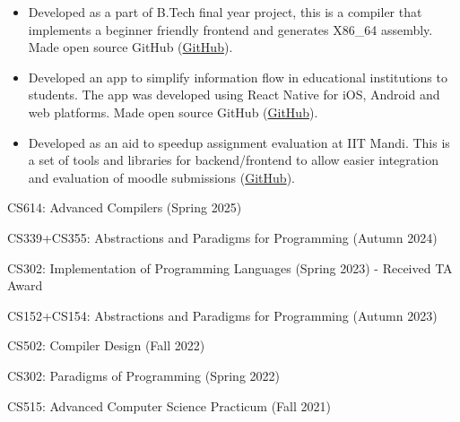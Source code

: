 \documentclass[10pt,a4paper,ragged2e]{altacv}
\begin{document}
\begin{itemize}
\item Developed as a part of B.Tech final year project, this is a compiler that implements a beginner friendly frontend and generates X86\_64 assembly. Made open source GitHub (\href{https://github.com/meetesh06/xope_4.2}{GitHub}).
\end{itemize}
\smallskip
{}
\begin{itemize}
\item Developed an app to simplify information flow in educational institutions to students. The app was developed using React Native for iOS, Android and web platforms. Made open source GitHub (\href{https://github.com/meetesh06/CampusStory}{GitHub}).
\end{itemize}
\smallskip
{}
\begin{itemize}
\item Developed as an aid to speedup assignment evaluation at IIT Mandi. This is a set of tools and libraries for backend/frontend to allow easier integration and evaluation of moodle submissions (\href{https://github.com/CompL-Research/CompL-Evaluator-Backend}{GitHub}).
\end{itemize}
\smallskip




CS614: Advanced Compilers (Spring 2025)
\smallskip

CS339+CS355: Abstractions and Paradigms for Programming (Autumn 2024)
\smallskip

CS302: Implementation of Programming Languages (Spring 2023) - Received TA Award
\smallskip

CS152+CS154: Abstractions and Paradigms for Programming (Autumn 2023)
\smallskip

CS502: Compiler Design (Fall 2022)
\smallskip

CS302: Paradigms of Programming (Spring 2022)
\smallskip

CS515: Advanced Computer Science Practicum (Fall 2021)
\smallskip

\nocite{*}
\end{document}
